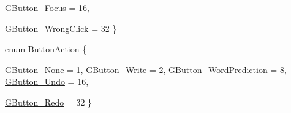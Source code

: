 \begin{DoxyCompactItemize}
\hyperlink{namespaceOpenViBEApplications_a4b71ded51609d9643a2256d0479f0bd4a0d2533891a14ad58885ee76b1bfee1fe}{GButton\_\-Focus} =  16, 
\par
\hyperlink{namespaceOpenViBEApplications_a4b71ded51609d9643a2256d0479f0bd4a1f308616964fcbc503475808eb77997c}{GButton\_\-WrongClick} =  32
 \}
\item 
enum \hyperlink{namespaceOpenViBEApplications_ad87631a613368054b4f5c133add72cb7}{ButtonAction} \{ \par
\hyperlink{namespaceOpenViBEApplications_ad87631a613368054b4f5c133add72cb7a04ab3a1584fc9f3dabc2ff5781c5112c}{GButton\_\-None} =  1, 
\hyperlink{namespaceOpenViBEApplications_ad87631a613368054b4f5c133add72cb7a8099c97e399d2df220566b04646ac64a}{GButton\_\-Write} =  2, 
\hyperlink{namespaceOpenViBEApplications_ad87631a613368054b4f5c133add72cb7a39009dbf318aa5aae1375894b2467b01}{GButton\_\-WordPrediction} =  8, 
\hyperlink{namespaceOpenViBEApplications_ad87631a613368054b4f5c133add72cb7aee3f1c18abf70d6232350056abd96f20}{GButton\_\-Undo} =  16, 
\par
\hyperlink{namespaceOpenViBEApplications_ad87631a613368054b4f5c133add72cb7a74180b022f4be8820ede7eb084d5ab5d}{GButton\_\-Redo} =  32
 \}
\end{DoxyCompactItemize}


